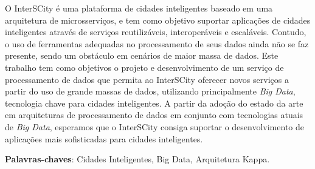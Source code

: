 \begin{resumo}

    O InterSCity é uma plataforma de cidades inteligentes baseado em uma
    arquitetura de microsserviços, e tem como objetivo suportar aplicações de
    cidades inteligentes através de serviços reutilizáveis, interoperáveis e
    escaláveis. Contudo, o uso de ferramentas adequadas no
    processamento de seus dados ainda não se faz presente, sendo um obstáculo
    em cenários de maior massa de dados. Este trabalho tem como objetivos o
    projeto e desenvolvimento de um serviço de processamento de dados que
    permita ao InterSCity oferecer novos serviços a partir do uso de grande
    massas de dados, utilizando principalmente \textit{Big Data}, tecnologia chave para
    cidades inteligentes. A partir da adoção do estado da arte em arquiteturas
    de processamento de dados em conjunto com tecnologias atuais de \textit{Big Data},
    esperamos que o InterSCity consiga suportar o desenvolvimento de aplicações
    mais sofisticadas para cidades inteligentes.

 \vspace{\onelineskip}
 \noindent
 \textbf{Palavras-chaves}: Cidades Inteligentes, Big Data, Arquitetura Kappa.
\end{resumo}
